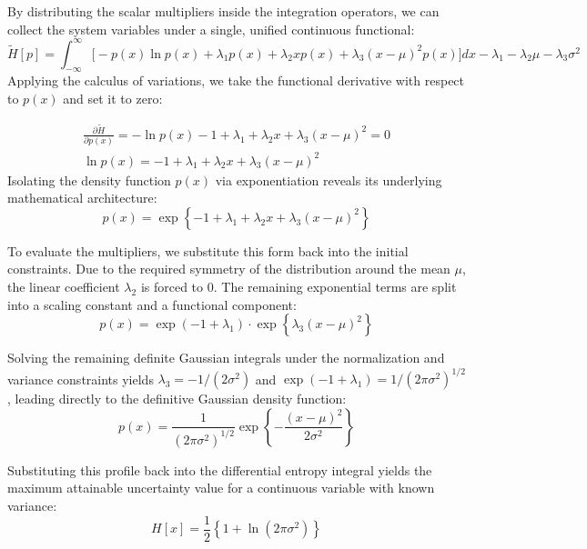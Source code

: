 \documentclass[11pt,a4paper]{article}
\begin{document}
By distributing the scalar multipliers inside the integration operators, we can collect the system variables under a single, unified continuous functional:
\begin{equation}
\tilde{H}[p] = \int_{-\infty}^{\infty} \Big[ -p(x) \ln p(x) + \lambda_1 p(x) + \lambda_2 x p(x) + \lambda_3 (x - \mu)^2 p(x) \Big] dx - \lambda_1 - \lambda_2\mu - \lambda_3\sigma^2
\end{equation}
Applying the calculus of variations, we take the functional derivative with respect to $p(x)$ and set it to zero:

\begin{equation}
\begin{aligned}
\frac{\partial \tilde{H}}{\partial p(x)}  =  -\ln p(x) - 1 + \lambda_1 + \lambda_2 x + \lambda_3 (x - \mu)^2 = 0 \\
\ln p(x) = -1 + \lambda_1 + \lambda_2 x + \lambda_3 (x - \mu)^2
\end{aligned}
\end{equation}
Isolating the density function $p(x)$ via exponentiation reveals its underlying mathematical architecture:
\begin{equation}
p(x) = \exp \left\{ -1 + \lambda_1 + \lambda_2 x + \lambda_3 (x - \mu)^2 \right\}
\end{equation}

To evaluate the multipliers, we substitute this form back into the initial constraints. Due to the required symmetry of the distribution around the mean $\mu$, the linear coefficient $\lambda_2$ is forced to $0$. The remaining exponential terms are split into a scaling constant and a functional component:
\begin{equation}
p(x) = \exp(-1 + \lambda_1) \cdot \exp\left\{\lambda_3 (x - \mu)^2\right\}
\end{equation}

Solving the remaining definite Gaussian integrals under the normalization and variance constraints yields $\lambda_3 = -1/(2\sigma^2)$ and $\exp(-1 + \lambda_1) = 1/(2\pi\sigma^2)^{1/2}$, leading directly to the definitive Gaussian density function:
\begin{equation}
p(x) = \frac{1}{(2\pi\sigma^2)^{1/2}} \exp \left\{ -\frac{(x - \mu)^2}{2\sigma^2} \right\}
\end{equation}

Substituting this profile back into the differential entropy integral yields the maximum attainable uncertainty value for a continuous variable with known variance:
\begin{equation}
H[x] = \frac{1}{2} \left\{ 1 + \ln(2\pi\sigma^2) \right\}
\end{equation}
\end{document}

